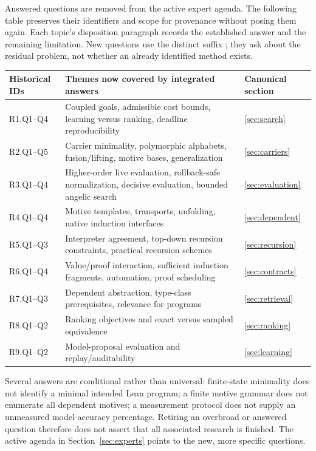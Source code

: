 Answered questions are removed from the active expert agenda. The following
table preserves their identifiers and scope for provenance without posing them
again. Each topic's disposition paragraph records the established answer and
the remaining limitation. New questions use the distinct suffix ;
they ask about the residual problem, not whether an already identified method
exists.

\begin{longtable}{@{}L{22mm}L{87mm}L{38mm}@{}}
\toprule Historical IDs & Themes now covered by integrated answers & Canonical section\\\midrule\endhead
R1.Q1--Q4 & Coupled goals, admissible cost bounds, learning versus ranking, deadline reproducibility & \ref{sec:search}\\
R2.Q1--Q5 & Carrier minimality, polymorphic alphabets, fusion/lifting, motive bases, generalization & \ref{sec:carriers}\\
R3.Q1--Q4 & Higher-order live evaluation, rollback-safe normalization, decisive evaluation, bounded angelic search & \ref{sec:evaluation}\\
R4.Q1--Q4 & Motive templates, transports, unfolding, native induction interfaces & \ref{sec:dependent}\\
R5.Q1--Q3 & Interpreter agreement, top-down recursion constraints, practical recursion schemes & \ref{sec:recursion}\\
R6.Q1--Q4 & Value/proof interaction, sufficient induction fragments, automation, proof scheduling & \ref{sec:contracts}\\
R7.Q1--Q3 & Dependent abstraction, type-class prerequisites, relevance for programs & \ref{sec:retrieval}\\
R8.Q1--Q2 & Ranking objectives and exact versus sampled equivalence & \ref{sec:ranking}\\
R9.Q1--Q2 & Model-proposal evaluation and replay/auditability & \ref{sec:learning}\\
\bottomrule
\end{longtable}

Several answers are conditional rather than universal: finite-state minimality
does not identify a minimal intended Lean program; a finite motive grammar
does not enumerate all dependent motives; a measurement protocol does not
supply an unmeasured model-accuracy percentage. Retiring an overbroad or
answered question therefore does not assert that all associated research is
finished. The active agenda in Section~\ref{sec:experts} points to the new,
more specific questions.

